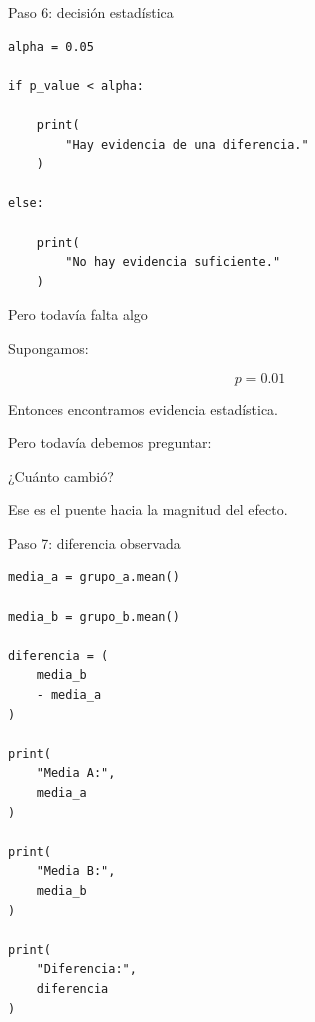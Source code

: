 \documentclass[aspectratio=169,11pt]{beamer}
\begin{document}

\begin{frame}[fragile]{Paso 6: decisión estadística}

\begin{lstlisting}
alpha = 0.05

if p_value < alpha:

    print(
        "Hay evidencia de una diferencia."
    )

else:

    print(
        "No hay evidencia suficiente."
    )
\end{lstlisting}

\end{frame}


\begin{frame}{Pero todavía falta algo}

Supongamos:

\[
p = 0.01
\]

Entonces encontramos evidencia estadística.

Pero todavía debemos preguntar:

\begin{center}

\Huge
¿Cuánto cambió?
\end{center}

\vspace{0.4cm}

Ese es el puente hacia la magnitud del efecto.

\end{frame}


\begin{frame}[fragile]{Paso 7: diferencia observada}

\begin{lstlisting}
media_a = grupo_a.mean()

media_b = grupo_b.mean()

diferencia = (
    media_b
    - media_a
)

print(
    "Media A:",
    media_a
)

print(
    "Media B:",
    media_b
)

print(
    "Diferencia:",
    diferencia
)
\end{lstlisting}

\end{frame}
\end{document}
